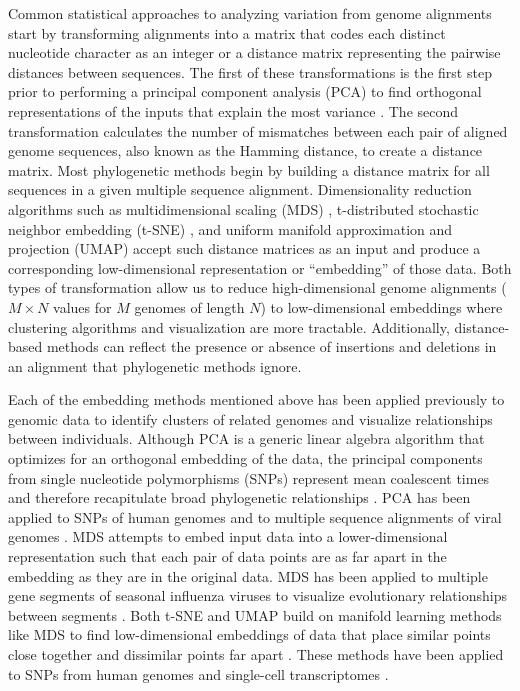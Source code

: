 \documentclass[10pt,letterpaper]{article}
\begin{document}
Common statistical approaches to analyzing variation from genome alignments start by transforming alignments into a matrix that codes each distinct nucleotide character as an integer or a distance matrix representing the pairwise distances between sequences.
The first of these transformations is the first step prior to performing a principal component analysis (PCA) to find orthogonal representations of the inputs that explain the most variance \cite{jolliffe_cadima_2016}.
The second transformation calculates the number of mismatches between each pair of aligned genome sequences, also known as the Hamming distance, to create a distance matrix.
Most phylogenetic methods begin by building a distance matrix for all sequences in a given multiple sequence alignment.
Dimensionality reduction algorithms such as multidimensional scaling (MDS) \cite{hout_papesh_goldinger_2012}, t-distributed stochastic neighbor embedding (t-SNE) \cite{maaten2008visualizing}, and uniform manifold approximation and projection (UMAP) \cite{lel2018umap} accept such distance matrices as an input and produce a corresponding low-dimensional representation or ``embedding'' of those data.
Both types of transformation allow us to reduce high-dimensional genome alignments ($M \times N$ values for $M$ genomes of length $N$) to low-dimensional embeddings where clustering algorithms and visualization are more tractable.
Additionally, distance-based methods can reflect the presence or absence of insertions and deletions in an alignment that phylogenetic methods ignore.

Each of the embedding methods mentioned above has been applied previously to genomic data to identify clusters of related genomes and visualize relationships between individuals.
Although PCA is a generic linear algebra algorithm that optimizes for an orthogonal embedding of the data, the principal components from single nucleotide polymorphisms (SNPs) represent mean coalescent times and therefore recapitulate broad phylogenetic relationships \cite{mcvean_2009}.
PCA has been applied to SNPs of human genomes \cite{novembre_2008,alexander_2009,mcvean_2009,auton_2015} and to multiple sequence alignments of viral genomes \cite{metsky_2017}.
MDS attempts to embed input data into a lower-dimensional representation such that each pair of data points are as far apart in the embedding as they are in the original data.
MDS has been applied to multiple gene segments of seasonal influenza viruses to visualize evolutionary relationships between segments \cite{rambaut_2008}.
Both t-SNE and UMAP build on manifold learning methods like MDS to find low-dimensional embeddings of data that place similar points close together and dissimilar points far apart \cite{kobak_2021}.
These methods have been applied to SNPs from human genomes \cite{diaz-papkovich_2019} and single-cell transcriptomes \cite{becht_2018,kobak_2019}.
\end{document}
